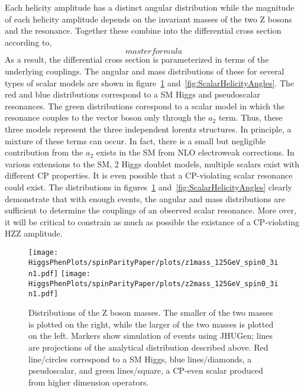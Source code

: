 Each helicity amplitude has a distinct angular distribution while the
magnitude of each helicity amplitude depends on the invariant masses 
of the two Z bosons and the resonance.  Together these combine into the
differential cross section according to,
\begin{equation}
master formula
\end{equation}
As a result, the differential cross section is parameterized in terms of 
the underlying couplings. 
The angular and mass distributions of these for several types of scalar 
models are shown in figure~\ref{fig:ScalarMasses} 
and~\ref{fig:ScalarHelicityAngles}.  The red and blue distributions
correspond to a SM Higgs and pseudoscalar resonances.  The green 
distributions corespond to a scalar model in which the resonance couples
to the vector boson only through the $a_2$ term.  Thus, these three models 
represent the three independent lorentz structures.  In principle,
a mixture of these terms can occur.  In fact, there is a small but 
negligible contribution from the $a_2$ exists in the SM from NLO 
electroweak corrections.  In various extensions to the SM, 2 Higgs doublet
models, multiple scalars exist with different CP properties.  It is
even possible that a CP-violating scalar resonance could exist.  The 
distributions in figures~\ref{fig:ScalarMasses} 
and~\ref{fig:ScalarHelicityAngles} clearly demonstrate that with 
enough events, the angular and mass distributions are sufficient to 
determine the couplings of an observed scalar resonance.  More over, 
it will be critical to constrain as much as possible the existance of
a CP-violating HZZ amplitude.  

\begin{figure}
\begin{center}
\texttt{[image: HiggsPhenPlots/spinParityPaper/plots/z1mass\_125GeV\_spin0\_3in1.pdf]}
\texttt{[image: HiggsPhenPlots/spinParityPaper/plots/z2mass\_125GeV\_spin0\_3in1.pdf]}
\label{fig:ScalarMasses}
\caption{Distributions of the Z boson masses.  The smaller of the two masses is
plotted on the right, while the larger of the two masses is plotted on the
left. Markers show simulation of events using JHUGen; lines are projections
of the analytical distribution described above.  Red line/circles correspond
to a SM Higgs, blue lines/diamonds, a pseudoscalar, and green lines/square, 
a CP-even scalar produced from higher dimension operators.}
\end{center}
\end{figure}


